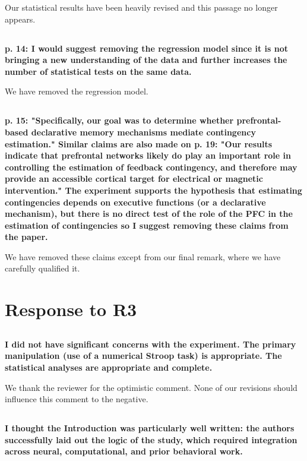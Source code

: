\documentclass[10pt,a4paper]{article} \usepackage{amsmath} \usepackage{parskip}
\begin{document}
Our statistical results have been heavily revised and this passage no longer
appears.

\subsection{} \textbf{
  p. 14: I would suggest removing the regression model since it is not bringing a
  new understanding of the data and further increases the number of statistical
  tests on the same data.
}

We have removed the regression model.

\subsection{} \textbf{
  p. 15: "Specifically, our goal was to determine whether prefrontal-based
  declarative memory mechanisms mediate contingency estimation." Similar claims
  are also made on p. 19: "Our results indicate that prefrontal networks likely do
  play an important role in controlling the estimation of feedback contingency,
  and therefore may provide an accessible cortical target for electrical or
  magnetic intervention." The experiment supports the hypothesis that estimating
  contingencies depends on executive functions (or a declarative mechanism), but
  there is no direct test of the role of the PFC in the estimation of
  contingencies so I suggest removing these claims from the paper.
}

We have removed these claims except from our final remark, where we have
carefully qualified it.

\section{Response to R3}

\subsection{} \textbf{
  I did not have significant concerns with the experiment. The primary
  manipulation (use of a numerical Stroop task) is appropriate. The statistical
  analyses are appropriate and complete.
}

We thank the reviewer for the optimistic comment. None of our revisions should
influence this comment to the negative.

\subsection{} \textbf{
  I thought the Introduction was particularly well written: the authors
  successfully laid out the logic of the study, which required integration across
  neural, computational, and prior behavioral work.
}
\end{document}
